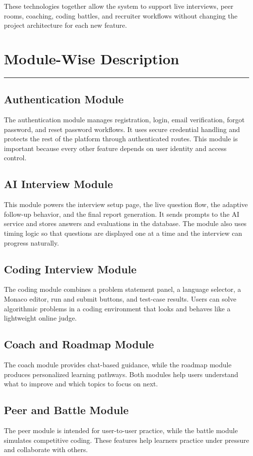﻿\documentclass[12pt,a4paper]{article}
\newcommand{\sectionline}{\vspace{0.4em}\hrule\vspace{0.8em}}
\begin{document}
These technologies together allow the system to support live interviews, peer rooms, coaching, coding battles, and recruiter workflows without changing the project architecture for each new feature.

\clearpage

\section{Module-Wise Description}
\sectionline
\subsection{Authentication Module}
The authentication module manages registration, login, email verification, forgot password, and reset password workflows. It uses secure credential handling and protects the rest of the platform through authenticated routes. This module is important because every other feature depends on user identity and access control.

\subsection{AI Interview Module}
This module powers the interview setup page, the live question flow, the adaptive follow-up behavior, and the final report generation. It sends prompts to the AI service and stores answers and evaluations in the database. The module also uses timing logic so that questions are displayed one at a time and the interview can progress naturally.

\subsection{Coding Interview Module}
The coding module combines a problem statement panel, a language selector, a Monaco editor, run and submit buttons, and test-case results. Users can solve algorithmic problems in a coding environment that looks and behaves like a lightweight online judge.

\subsection{Coach and Roadmap Module}
The coach module provides chat-based guidance, while the roadmap module produces personalized learning pathways. Both modules help users understand what to improve and which topics to focus on next.

\subsection{Peer and Battle Module}
The peer module is intended for user-to-user practice, while the battle module simulates competitive coding. These features help learners practice under pressure and collaborate with others.
\end{document}
